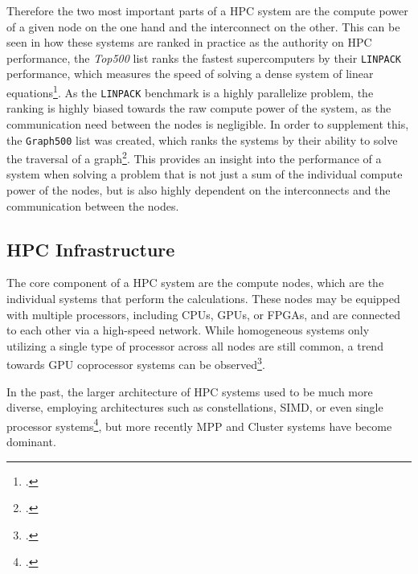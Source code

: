 Therefore the two  most important parts of a \ac{HPC} system are the compute power of a given node on the one hand and the interconnect on the other.
This can be seen in how these systems are ranked in practice as the authority on \ac{HPC} performance, the \textit{Top500} list ranks the fastest supercomputers by their \texttt{LINPACK} performance,
which measures the speed of solving a dense system of linear equations\footcite{dongarraLINPACKBenchmarkPresent2003}.
As the \texttt{LINPACK} benchmark is a highly parallelize problem, the ranking is highly biased towards the raw compute power of the system,
as the communication need between the nodes is negligible.
In order to supplement this, the \texttt{Graph500} list was created, which ranks the systems by their ability to solve the traversal of a graph\footcite{murphyIntroducingGraph5002010}.
This provides an insight into the performance of a system when solving a problem that is not just a sum of the individual compute power of the nodes,
but is also highly dependent on the interconnects and the communication between the nodes.

\subsection{HPC Infrastructure}
\label{sec:hpc_infrastructure}

The core component of a \ac{HPC} system are the compute nodes, which are the individual systems that perform the calculations.
These nodes may be equipped with multiple processors, including \ac{CPU}s, \ac{GPU}s, or \gls{FPGA}s, and are connected to each other via a high-speed network.
While homogeneous systems only utilizing a single type of processor across all nodes are still common, a trend towards \ac{GPU} coprocessor systems can be observed\footcite{kindratenkoTrendsHighPerformanceComputing2011}.

In the past, the larger architecture of \ac{HPC} systems used to be much more diverse, employing architectures such as
constellations, \ac{SIMD}, or even single processor systems\footcite{top500ListStatisticsArchitecturea},
but more recently
\ac{MPP} and Cluster systems have become dominant.

